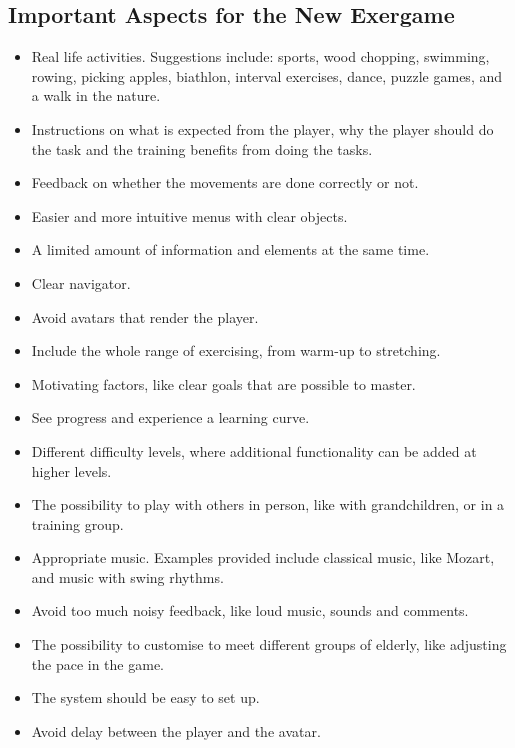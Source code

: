 \subsection{Important Aspects for the New Exergame}
\begin{itemize}
\item Real life activities. Suggestions include: sports, wood chopping, swimming, rowing, picking apples, biathlon, interval exercises, dance, puzzle games, and a walk in the nature.
\item Instructions on what is expected from the player, why the player should do the task and the training benefits from doing the tasks.
\item Feedback on whether the movements are done correctly or not.
\item Easier and more intuitive menus with clear objects.
\item A limited amount of information and elements at the same time.
\item Clear navigator.
\item Avoid avatars that render the player.
\item Include the whole range of exercising, from warm-up to stretching.
\item Motivating factors, like clear goals that are possible to master.
\item See progress and experience a learning curve.
\item Different difficulty levels, where additional functionality can be added at higher levels.
\item The possibility to play with others in person, like with grandchildren, or in a training group.
\item Appropriate music. Examples provided include classical music, like Mozart, and music with swing rhythms.
\item Avoid too much noisy feedback, like loud music, sounds and comments.
\item The possibility to customise to meet different groups of elderly, like adjusting the pace in the game.
\item The system should be easy to set up.
\item Avoid delay between the player and the avatar.
\end{itemize}






